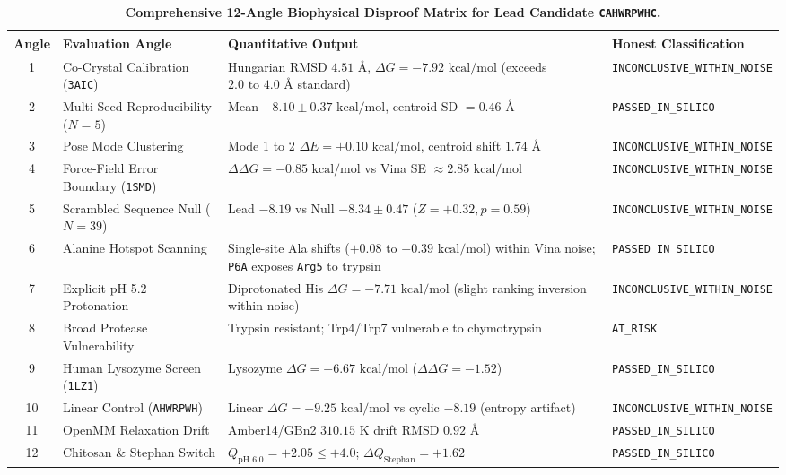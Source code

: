 \documentclass[11pt,a4paper]{article}
\begin{document}
\begin{table}[htbp]
\centering
\small
\caption{\textbf{Comprehensive 12-Angle Biophysical Disproof Matrix for Lead Candidate \texttt{CAHWRPWHC}.}}
\label{tab:disproof}
\begin{tabular}{clll}
\toprule
\textbf{Angle} & \textbf{Evaluation Angle} & \textbf{Quantitative Output} & \textbf{Honest Classification} \\
\midrule
1 & Co-Crystal Calibration (\texttt{3AIC}) & Hungarian RMSD $4.51\text{ \AA}$, $\Delta G = -7.92\text{ kcal/mol}$ (exceeds $2.0\text{ to }4.0\text{ \AA}$ standard) & \texttt{INCONCLUSIVE\_WITHIN\_NOISE} \\
2 & Multi-Seed Reproducibility ($N=5$) & Mean $-8.10 \pm 0.37\text{ kcal/mol}$, centroid SD $= 0.46\text{ \AA}$ & \texttt{PASSED\_IN\_SILICO} \\
3 & Pose Mode Clustering & Mode 1 to 2 $\Delta E = +0.10\text{ kcal/mol}$, centroid shift $1.74\text{ \AA}$ & \texttt{INCONCLUSIVE\_WITHIN\_NOISE} \\
4 & Force-Field Error Boundary (\texttt{1SMD}) & $\Delta\Delta G = -0.85\text{ kcal/mol}$ vs Vina SE $\approx 2.85\text{ kcal/mol}$ & \texttt{INCONCLUSIVE\_WITHIN\_NOISE} \\
5 & Scrambled Sequence Null ($N=39$) & Lead $-8.19$ vs Null $-8.34 \pm 0.47$ ($Z = +0.32, p = 0.59$) & \texttt{INCONCLUSIVE\_WITHIN\_NOISE} \\
6 & Alanine Hotspot Scanning & Single-site Ala shifts ($+0.08$ to $+0.39\text{ kcal/mol}$) within Vina noise; \texttt{P6A} exposes \texttt{Arg5} to trypsin & \texttt{PASSED\_IN\_SILICO} \\
7 & Explicit pH 5.2 Protonation & Diprotonated His $\Delta G = -7.71\text{ kcal/mol}$ (slight ranking inversion within noise) & \texttt{INCONCLUSIVE\_WITHIN\_NOISE} \\
8 & Broad Protease Vulnerability & Trypsin resistant; Trp4/Trp7 vulnerable to chymotrypsin & \texttt{AT\_RISK} \\
9 & Human Lysozyme Screen (\texttt{1LZ1}) & Lysozyme $\Delta G = -6.67\text{ kcal/mol}$ ($\Delta\Delta G = -1.52$) & \texttt{PASSED\_IN\_SILICO} \\
10 & Linear Control (\texttt{AHWRPWH}) & Linear $\Delta G = -9.25\text{ kcal/mol}$ vs cyclic $-8.19$ (entropy artifact) & \texttt{INCONCLUSIVE\_WITHIN\_NOISE} \\
11 & OpenMM Relaxation Drift & Amber14/GBn2 $310.15\text{ K}$ drift RMSD $0.92\text{ \AA}$ & \texttt{PASSED\_IN\_SILICO} \\
12 & Chitosan \& Stephan Switch & $Q_{\text{pH 6.0}} = +2.05 \le +4.0$; $\Delta Q_{\text{Stephan}} = +1.62$ & \texttt{PASSED\_IN\_SILICO} \\
\bottomrule
\end{tabular}
\end{table}
\end{document}

